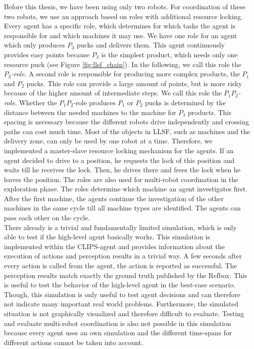 Before this thesis, we have been using only two robots. For coordination of these two robots, we use an approach based on roles with additional resource locking. Every agent has a specific role, which determines for which tasks the agent is responsible for and which machines it may use. We have one role for an agent which only produces $P_3$ pucks and delivers them. This agent continuously provides easy points because $P_3$ is the simplest product, which needs only one resource puck (see Figure \ref{fig:llsf_chain}). In the following, we call this role the \textit{$P_3$-role}. A second role is responsible for producing  more complex products, the $P_1$ and $P_2$ pucks. This role can provide a large amount of points, but is more risky because of the higher amount of intermediate steps. We call this role the \textit{$P_1P_2$-role}. Whether the $P_1P_2$-role produces $P_1$ or $P_2$ pucks is determined by the distance between the needed machines to the machine for $P_3$ products. This spacing is necessary because the different robots drive independently and crossing paths can cost much time. Most of the objects in LLSF, such as machines and the delivery zone, can only be used by one robot at a time. Therefore, we implemented a master-slave resource locking mechanism for the agents. If an agent decided to drive to a position, he requests the lock of this position and waits till he receives the lock. Then, he drives there and frees the lock when he leaves the position. The roles are also used for multi-robot coordination in the exploration phase. The roles determine which machine an agent investigates first. After the first machine, the agents continue the investigation of the other machines in the same cycle till all machine types are identified. The agents can pass each other on the cycle.\\
There already is a trivial and fundamentally limited simulation, which is only able to test if the high-level agent basically works. This simulation is implemented within the CLIPS-agent and provides information about the execution of actions and perception results in a trivial way. A few seconds after every action is called from the agent, the action is reported as successful. The perception results match exactly the ground truth published by the Refbox. This is useful to test the behavior of the high-level agent in the best-case scenario. Though, this simulation is only useful to test agent decisions and can therefore not indicate many important real world problems. Furthermore, the simulated situation is not graphically visualized and therefore difficult to evaluate. Testing and evaluate multi-robot coordination is also not possible in this simulation because every agent uses an own simulation and the different time-spans for different actions cannot be taken into account.

